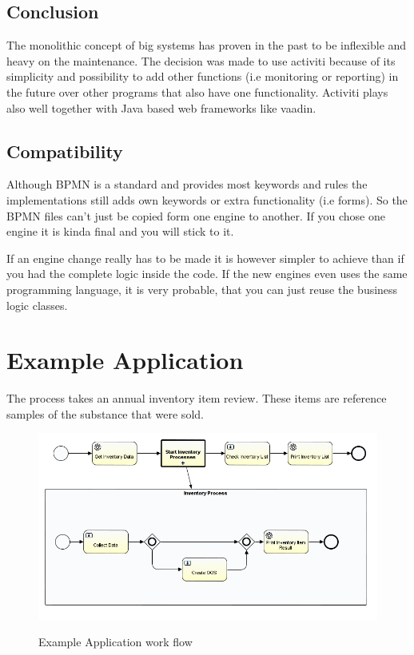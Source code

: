 \documentclass[paper=a4,twoside=false,BCOR=0mm,DIV=calc,fontsize=12pt]{scrartcl}
\begin{document}
\subsection{Conclusion}
The monolithic concept of big systems has proven in the past to be inflexible and heavy on the maintenance. 
The decision was made to use activiti because of its simplicity and possibility to add other functions (i.e monitoring or reporting) in the future over other programs that also have one functionality.
Activiti plays also well together with Java based web frameworks like vaadin.


\subsection{Compatibility}
Although BPMN is a standard and provides most keywords and rules the implementations still adds own keywords or extra functionality (i.e
forms). So the BPMN files can't just be copied form one engine to another. If you chose one engine it is kinda final and you will stick to it.

If an engine change really has to be made it is however simpler to achieve than if you had the complete logic inside the code. If the new engines even
uses the same programming language, it is very probable, that you can just reuse the business logic classes. 



\section{Example Application}
The process takes an annual inventory item review. These items are reference samples of the substance that were sold.

\begin{figure}
    \begin{center}
      \includegraphics[width=1\textwidth]{./img/PanExampleBPMN.png}\\
    \end{center}
  \caption{Example Application work flow}
  \label{panexampleWorkflow}
\end{figure} 
\end{document}
